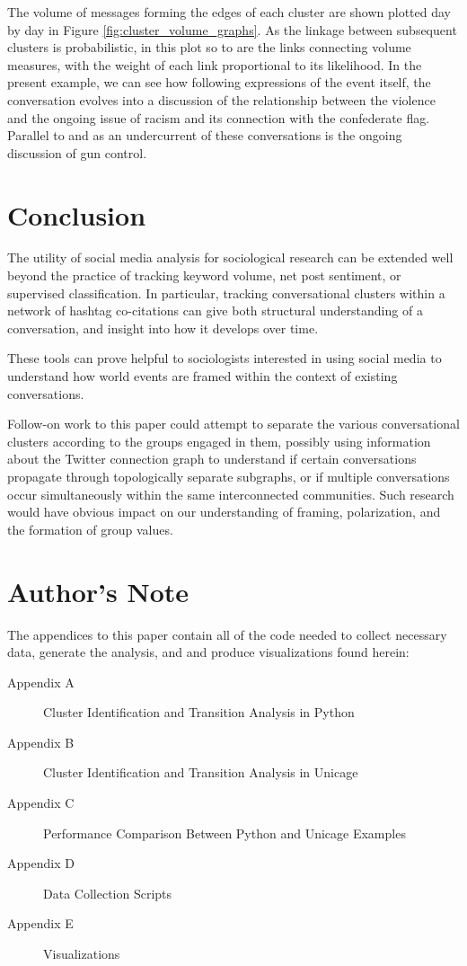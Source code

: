 \documentclass[12pt]{article}
\begin{document}
The volume of messages forming the edges of each cluster are shown plotted day by day in Figure \ref{fig:cluster_volume_graphs}. As the linkage between subsequent clusters is probabilistic, in this plot so to are the links connecting volume measures, with the weight of each link proportional to its likelihood. In the present example, we can see how following expressions of the event itself, the conversation evolves into a discussion of the relationship between the violence and the ongoing issue of racism and its connection with the confederate flag. Parallel to and as an undercurrent of these conversations is the ongoing discussion of gun control.

\section{Conclusion}
The utility of social media analysis for sociological research can be extended well beyond the practice of tracking keyword volume, net post sentiment, or supervised classification. In particular, tracking conversational clusters within a network of hashtag co-citations can give both structural understanding of a conversation, and insight into how it develops over time.

These tools can prove helpful to sociologists interested in using social media to understand how world events are framed within the context of existing conversations.

Follow-on work to this paper could attempt to separate the various conversational clusters according to the groups engaged in them, possibly using information about the Twitter connection graph to understand if certain conversations propagate through topologically separate subgraphs, or if multiple conversations occur simultaneously within the same interconnected communities. Such research would have obvious impact on our understanding of framing, polarization, and the formation of group values.

\section{Author's Note}
The appendices to this paper contain all of the code needed to collect necessary data, generate the analysis, and and produce visualizations found herein:



\begin{description}
  \item[Appendix A] Cluster Identification and Transition Analysis in Python
  \item[Appendix B] Cluster Identification and Transition Analysis in Unicage
  \item[Appendix C] Performance Comparison Between Python and Unicage Examples
  \item[Appendix D] Data Collection Scripts
  \item[Appendix E] Visualizations
\end{description}
\end{document}
